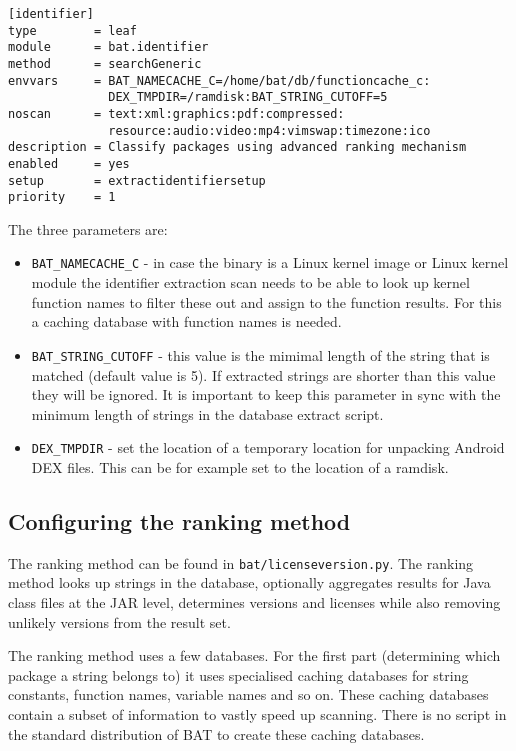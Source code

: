 \documentclass[10pt]{article}
\begin{document}
\begin{verbatim}
[identifier]
type        = leaf
module      = bat.identifier
method      = searchGeneric
envvars     = BAT_NAMECACHE_C=/home/bat/db/functioncache_c:
              DEX_TMPDIR=/ramdisk:BAT_STRING_CUTOFF=5
noscan      = text:xml:graphics:pdf:compressed:
              resource:audio:video:mp4:vimswap:timezone:ico
description = Classify packages using advanced ranking mechanism
enabled     = yes
setup       = extractidentifiersetup
priority    = 1
\end{verbatim}

The three parameters are:

\begin{itemize}
\item \texttt{BAT\_NAMECACHE\_C} - in case the binary is a Linux kernel image
or Linux kernel module the identifier extraction scan needs to be able to look
up kernel function names to filter these out and assign to the function
results. For this a caching database with function names is needed.
\item \texttt{BAT\_STRING\_CUTOFF} - this value is the mimimal length of the
string that is matched (default value is 5). If extracted strings are shorter
than this value they will be ignored. It is important to keep this parameter in
sync with the minimum length of strings in the database extract script.
\item \texttt{DEX\_TMPDIR} - set the location of a temporary location for
unpacking Android DEX files. This can be for example set to the location of a
ramdisk.
\end{itemize}

\subsection{Configuring the ranking method}

The ranking method can be found in \texttt{bat/licenseversion.py}. The ranking
method looks up strings in the database, optionally aggregates results for
Java class files at the JAR level, determines versions and licenses while also
removing unlikely versions from the result set.

The ranking method uses a few databases. For the first part (determining which
package a string belongs to) it uses specialised caching databases for string
constants, function names, variable names and so on. These caching databases
contain a subset of information to vastly speed up scanning. There is no script
in the standard distribution of BAT to create these caching databases.
\end{document}
